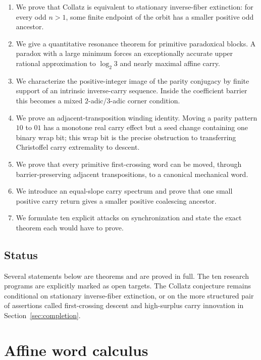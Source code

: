 \documentclass[11pt,reqno]{amsart}
\numberwithin{equation}{section}
\theoremstyle{definition}
\theoremstyle{remark}
\begin{document}
\begin{enumerate}[label=(\roman*),leftmargin=2.5em]
\item We prove that Collatz is equivalent to stationary inverse-fiber
      extinction: for every odd $n>1$, some finite endpoint of the orbit has a
      smaller positive odd ancestor.
\item We give a quantitative resonance theorem for primitive paradoxical
      blocks.  A paradox with a large minimum forces an exceptionally accurate
      upper rational approximation to $\log_2 3$ and nearly maximal affine
      carry.
\item We characterize the positive-integer image of the parity conjugacy by
      finite support of an intrinsic inverse-carry sequence.  Inside the
      coefficient barrier this becomes a mixed $2$-adic/$3$-adic corner
      condition.
\item We prove an adjacent-transposition winding identity.  Moving a parity
      pattern $10$ to $01$ has a monotone real carry effect but a seed change
      containing one binary wrap bit; this wrap bit is the precise obstruction
      to transferring Christoffel carry extremality to descent.
\item We prove that every primitive first-crossing word can be moved, through
      barrier-preserving adjacent transpositions, to a canonical mechanical
      word.
\item We introduce an equal-slope carry spectrum and prove that one small
      positive carry return gives a smaller positive coalescing ancestor.
\item We formulate ten explicit attacks on synchronization and state the exact
      theorem each would have to prove.
\end{enumerate}

\subsection*{Status}

Several statements below are theorems and are proved in full.  The ten
research programs are explicitly marked as open targets.  The Collatz
conjecture remains conditional on stationary inverse-fiber extinction, or on
the more structured pair of assertions called first-crossing descent and
high-surplus carry innovation in Section~\ref{sec:completion}.

\section{Affine word calculus}\label{sec:affine}
\end{document}
